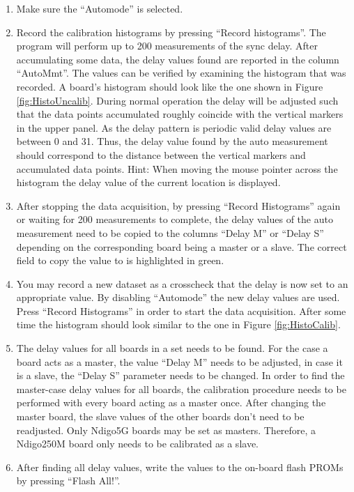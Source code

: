         \begin{enumerate}
            \item Make sure the ``Automode'' is selected.
            \item Record the calibration histograms by pressing ``Record histograms''. The program will perform up to 200 measurements of the sync delay. After accumulating some data, the delay values found are reported in the column ``AutoMmt''. The values can be verified by examining the histogram that was recorded. A board's histogram should look like the one shown in Figure \ref{fig:HistoUncalib}. During normal operation the delay will be adjusted such that the data points accumulated roughly coincide with the vertical markers in the upper panel. As the delay pattern is periodic valid delay values are between 0 and 31. Thus, the delay value found by the auto measurement should correspond to the distance between the vertical markers and accumulated data points. Hint: When moving the mouse pointer across the histogram the delay value of the current location is displayed.
            \item After stopping the data acquisition, by pressing ``Record Histograms'' again or waiting for 200 measurements to complete, the delay values of the auto measurement need to be copied to the columns ``Delay M'' or ``Delay S'' depending on the corresponding board being a master or a slave. The correct field to copy the value to is highlighted in green.
            \item You may record a new dataset as a crosscheck that the delay is now set to an appropriate value. By disabling ``Automode'' the new delay values are used. Press ``Record Histograms'' in order to start the data acquisition. After some time the histogram should look similar to the one in Figure \ref{fig:HistoCalib}.
            \item The delay values for all boards in a set needs to be found. For the case a board acts as a master, the value ``Delay M'' needs to be adjusted, in case it is a slave, the ``Delay S'' parameter needs to be changed. In order to find the master-case delay values for all boards, the calibration procedure needs to be performed with every board acting as a master once. After changing the master board, the slave values of the other boards don't need to be readjusted. Only Ndigo5G boards may be set as masters. Therefore, a Ndigo250M board only needs to be calibrated as a slave.
            \item After finding all delay values, write the values to the on-board flash PROMs by pressing ``Flash All!''.
        \end{enumerate}

